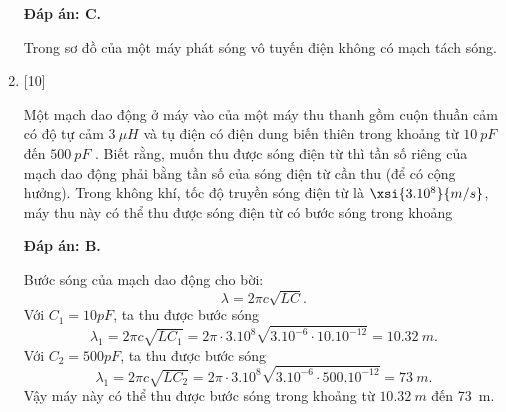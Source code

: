 \begin{enumerate}[label=\bfseries Câu \arabic*:]
	\loigiai
	{		\textbf{Đáp án: C.}
		
		Trong sơ đồ của một máy phát sóng vô tuyến điện không có mạch tách sóng. 
		
	}
	
	\item {} [10]
	\cauhoi
	{Một mạch dao động ở máy vào của một máy thu thanh gồm cuộn thuần cảm có độ tự cảm $\SI{3}{\mu H}$ và tụ điện có điện dung biến thiên trong khoảng từ $\SI{10}{pF}$ đến $ \SI{500}{pF} $ . Biết rằng, muốn thu được sóng điện từ thì tần số riêng của mạch dao động phải bằng tần số của sóng điện từ cần thu (để có cộng hưởng). Trong không khí, tốc độ truyền sóng điện từ là $ \xsi{3.10^{8}}{m/s} $, máy thu này có thể thu được sóng điện từ có bước sóng trong khoảng
		
	}
	
	\loigiai
	{		\textbf{Đáp án: B.}
		
		Bước sóng của mạch dao động cho bời:
		$$
		\lambda=2 \pi c \sqrt{L C}.
		$$
		Với $C_{1}=10 p F$, ta thu được bước sóng
		$$
		\lambda_{1}=2 \pi c \sqrt{L C_{1}}=2 \pi \cdot 3.10^{8} \sqrt{3.10^{-6} \cdot 10.10^{-12}}= \SI{10,32}{m}.
		$$
		Với $C_{2}=500 p F$, ta thu được bước sóng
		$$
		\lambda_{1}=2 \pi c \sqrt{L C_{2}}=2 \pi \cdot 3.10^{8} \sqrt{3.10^{-6} \cdot 500.10^{-12}}= \SI{73}{m}.
		$$
		Vậy máy này có thể thu được bước sóng trong khoảng từ $\SI{10,32}{m}$ đến \SI{73}{m}.
		
	}
	
\end{enumerate}
